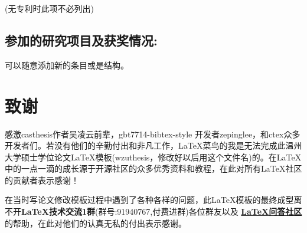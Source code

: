 (无专利时此项不必列出)

\section*{参加的研究项目及获奖情况:}

可以随意添加新的条目或是结构。

\chapter[致谢]{致\quad 谢}%

感激casthesis作者吴凌云前辈，gbt7714-bibtex-style
开发者zepinglee，和ctex众多开发者们。若没有他们的辛勤付出和非凡工作，\LaTeX{}菜鸟的我是无法完成此温州大学硕士学位论文\LaTeX{}模板(wzuthesis，修改好以后用这个文件名)的。在\LaTeX{}中的一点一滴的成长源于开源社区的众多优秀资料和教程，在此对所有\LaTeX{}社区的贡献者表示感谢！

在当时写论文修改模板过程中遇到了各种各样的问题，此\LaTeX{}模板的最终成型离不开\textbf{\LaTeX{}技术交流1群}(群号:91940767,付费进群)各位群友以及 \href{https://wenda.latexstudio.net/}{\textbf{\LaTeX{}问答社区}}的帮助，在此对他们的认真无私的付出表示感谢。

\cleardoublepage[plain]%

